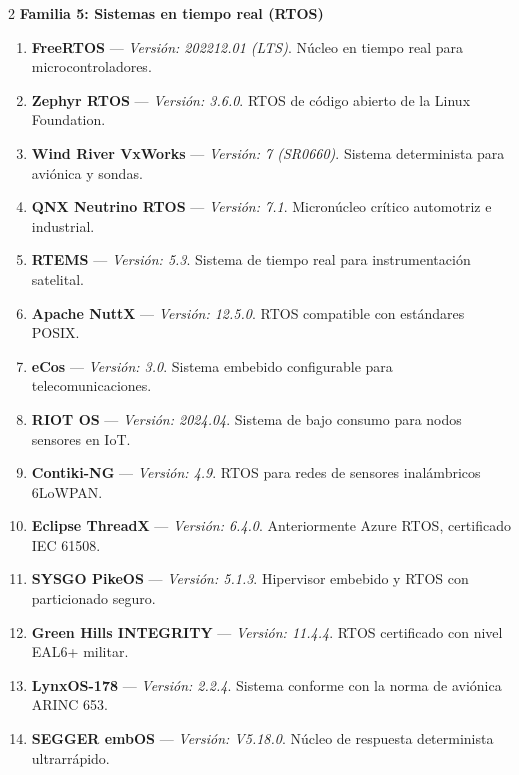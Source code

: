 \documentclass[12pt]{article}
\begin{document}
\begin{multicols}{2}
\medskip
\noindent\textbf{Familia 5: Sistemas en tiempo real (RTOS)}\par\smallskip
\begin{enumerate}[label=\textbf{\arabic*.}, leftmargin=*, noitemsep, topsep=1pt, start=67]
    \item \textbf{FreeRTOS} --- \textit{Versión: 202212.01 (LTS)}. Núcleo en tiempo real para microcontroladores.
    \item \textbf{Zephyr RTOS} --- \textit{Versión: 3.6.0}. RTOS de código abierto de la Linux Foundation.
    \item \textbf{Wind River VxWorks} --- \textit{Versión: 7 (SR0660)}. Sistema determinista para aviónica y sondas.
    \item \textbf{QNX Neutrino RTOS} --- \textit{Versión: 7.1}. Micronúcleo crítico automotriz e industrial.
    \item \textbf{RTEMS} --- \textit{Versión: 5.3}. Sistema de tiempo real para instrumentación satelital.
    \item \textbf{Apache NuttX} --- \textit{Versión: 12.5.0}. RTOS compatible con estándares POSIX.
    \item \textbf{eCos} --- \textit{Versión: 3.0}. Sistema embebido configurable para telecomunicaciones.
    \item \textbf{RIOT OS} --- \textit{Versión: 2024.04}. Sistema de bajo consumo para nodos sensores en IoT.
    \item \textbf{Contiki-NG} --- \textit{Versión: 4.9}. RTOS para redes de sensores inalámbricos 6LoWPAN.
    \item \textbf{Eclipse ThreadX} --- \textit{Versión: 6.4.0}. Anteriormente Azure RTOS, certificado IEC 61508.
    \item \textbf{SYSGO PikeOS} --- \textit{Versión: 5.1.3}. Hipervisor embebido y RTOS con particionado seguro.
    \item \textbf{Green Hills INTEGRITY} --- \textit{Versión: 11.4.4}. RTOS certificado con nivel EAL6+ militar.
    \item \textbf{LynxOS-178} --- \textit{Versión: 2.2.4}. Sistema conforme con la norma de aviónica ARINC 653.
    \item \textbf{SEGGER embOS} --- \textit{Versión: V5.18.0}. Núcleo de respuesta determinista ultrarrápido.
\end{enumerate}


\end{multicols}
\end{document}
